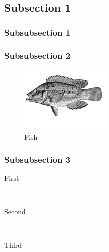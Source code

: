 \documentclass[12pt]{article} %
\begin{document}
\lipsum[5] %


\subsection{Subsection 1} %

\subsubsection{Subsubsection 1} %

\lipsum[6] %


\subsubsection{Subsubsection 2} %

\lipsum[6] %
\begin{figure} %
  \begin{center}
    \includegraphics[width=0.38\textwidth]{fish}
  \end{center}
  \caption{Fish}
\end{figure}
\lipsum[7-8] %


\subsubsection{Subsubsection 3} %

\begin{description} %

\item[First] \hfill \\
\lipsum[9] %

\item[Second] \hfill \\
\lipsum[10] %

\item[Third] \hfill \\
\lipsum[11] %

\end{description} 
\end{document}
